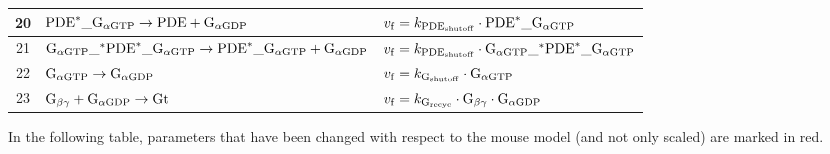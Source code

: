 \documentclass[a4paper, 12pt]{book}
\begin{document}
\begin{table}[H]
\begin{tabular}{c | l | l}
\hline
20 & ${\rm PDE}^{*}\_{\rm G}_{\alpha{\rm GTP}} \rightarrow {\rm PDE} + {\rm G}_{\alpha{\rm GDP}} $ & $v_{\rm f} =  k_{\rm PDE_{shutoff}} \cdot {\rm PDE}^{*}\_{\rm G}_{\alpha{\rm GTP}} $\\
\hline
21 & ${\rm G}_{\alpha{\rm GTP}}\_{\rm {}^{*} PDE}^{*}\_{\rm G}_{\alpha{\rm GTP}} \rightarrow {\rm PDE}^{*}\_{\rm G}_{\alpha{\rm GTP}} + {\rm G}_{\alpha{\rm GDP}} $ & $v_{\rm f} =  k_{\rm PDE_{shutoff}} \cdot {\rm G}_{\alpha{\rm GTP}}\_{\rm {}^{*} PDE}^{*}\_{\rm G}_{\alpha{\rm GTP}} $\\
\hline
22 & ${\rm G}_{\alpha{\rm GTP}} \rightarrow {\rm G}_{\alpha{\rm GDP}}$ & $v_{\rm f} =  k_{\rm G_{shutoff}} \cdot {\rm G}_{\alpha{\rm GTP}}$\\
\hline
23 & $ {\rm G}_{\beta\gamma} + {\rm G}_{\alpha{\rm GDP}} \rightarrow {\rm Gt}$ & $v_{\rm f} =  k_{\rm G_{recyc}} \cdot  {\rm G}_{\beta\gamma} \cdot {\rm G}_{\alpha{\rm GDP}} $\\
\hline
\end{tabular}
\end{table}
\restoregeometry

In the following table, parameters that have been changed with respect to the mouse model (and not only scaled) are marked in red.
\end{document}
